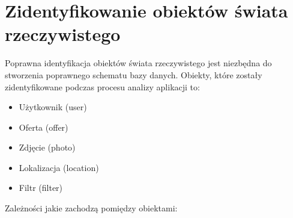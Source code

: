 \section{Zidentyfikowanie obiektów świata rzeczywistego}
Poprawna identyfikacja obiektów świata rzeczywistego jest niezbędna do stworzenia poprawnego schematu bazy danych. Obiekty, które zostały zidentyfikowane podczas procesu analizy aplikacji to:
\begin{itemize}
\item Użytkownik (user)
\item Oferta (offer)
\item Zdjęcie (photo)
\item Lokalizacja (location)
\item Filtr (filter)
\end{itemize}
Zależności jakie zachodzą pomiędzy obiektami:\\
\noindent
\begin{minipage}{\linewidth}
\label{erd}
\end{minipage}
